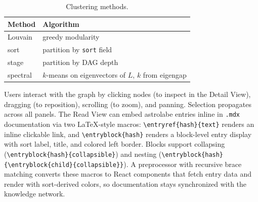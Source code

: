 \begin{table}[H]
\centering
\small
\caption{Clustering methods.}
\label{tab:cluster}
\begin{tabular}{ll}
\toprule
Method & Algorithm \\
\midrule
Louvain & greedy modularity \\
sort & partition by \texttt{sort} field \\
stage & partition by DAG depth \\
spectral & $k$-means on eigenvectors of $L$, $k$ from eigengap \\
\bottomrule
\end{tabular}
\end{table}

Users interact with the graph by clicking nodes (to inspect in the Detail View), dragging (to reposition), scrolling (to zoom), and panning. Selection propagates across all panels. The Read View can embed astrolabe entries inline in \texttt{.mdx} documentation via two \LaTeX-style macros: \verb|\entryref{hash}{text}| renders an inline clickable link, and \verb|\entryblock{hash}| renders a block-level entry display with sort label, title, and colored left border. Blocks support collapsing (\verb|\entryblock{hash}{collapsible}|) and nesting (\verb|\entryblock{hash}{\entryblock{child}{collapsible}}|). A preprocessor with recursive brace matching converts these macros to React components that fetch entry data and render with sort-derived colors, so documentation stays synchronized with the knowledge network.
